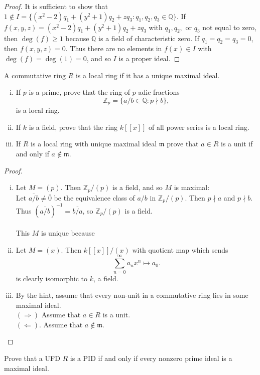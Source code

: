\documentclass{article}
\newenvironment{problem}[2][Problem]{\begin{trivlist}
\item[\hskip \labelsep {\bfseries #1}\hskip \labelsep {\bfseries #2.}]}{\end{trivlist}}
\newcommand{\set}[1]{\{ #1 \}}
\newcommand{\paren}[1]{\left( #1 \right)}
\begin{document}
\begin{proof} It is sufficient to show that
  $1 \not\in I = \set{(x^2-2)q_1 + (y^2 + 1)q_2 + z q_3 : q_1, q_2, q_3 \in \mathbb Q}$.
  If $f(x, y, z) = (x^2-2)q_1 + (y^2 + 1)q_2 + z q_3$ with $q_1, q_2,$ or $q_3$
  not equal to zero, then $\deg(f) \geq 1$ because $\mathbb Q$ is a field of
  characteristic zero. If $q_1 = q_2 = q_3 = 0$, then $f(x,y,z) = 0$. Thus there
  are no elements in $f(x) \in I$ with $\deg(f) = \deg(1) = 0$, and so $I$ is a
  proper ideal.
\end{proof}
\pagebreak
\begin{problem}{5.13}
  A commutative ring $R$ is a local ring if it has a unique maximal ideal.
  \begin{enumerate}[(i)]
    \item If $p$ is a prime, prove that the ring of $p$-adic fractions \[
      \mathbb Z_p = \set{a/b \in \mathbb Q : p \nmid b},
    \] is a local ring.
    \item If $k$ is a field, prove that the ring $k[[x]]$ of all power series
      is a local ring.
    \item If $R$ is a local ring with unique maximal ideal $\mathfrak m$ prove
    that $a \in R$ is a unit if and only if $a \not\in \mathfrak m$.
  \end{enumerate}
\end{problem}

\begin{proof} ~
  \begin{enumerate}[(i)]
    \item Let $M = \paren p$. Then $\mathbb Z_p/\paren p$ is a field, and so $M$
    is maximal:
    \\
    Let $\overline{a/b} \neq \overline 0$ be the equivalence class
    of $a/b$ in $\mathbb Z_p/\paren p$. Then $p \nmid a$ and $p \nmid b$.
    Thus $(\overline{a/b})^{-1} = \overline{b/a}$, so $\mathbb Z_p/\paren p$ is
    a field.
    \\~\\
    This $M$ is unique because
    \item Let $M = \paren x$. Then $k[[x]] / \paren x$ with quotient map which
    sends \[
      \sum_{n=0}^\infty a_n x^n \mapsto a_0.
    \] is clearly isomorphic to $k$, a field.
    \item By the hint, assume that every non-unit in a commutative ring lies in
    some maximal ideal. \\
    $(\Longrightarrow)$ Assume that $a \in R$ is a unit.
    \\
    $(\Longleftarrow)$. Assume that $a \not\in \mathfrak m$.
  \end{enumerate}
\end{proof}
\pagebreak
\begin{problem}{5.17}
  Prove that a UFD $R$ is a PID if and only if every nonzero prime ideal is a
  maximal ideal.
\end{problem}
\end{document}
